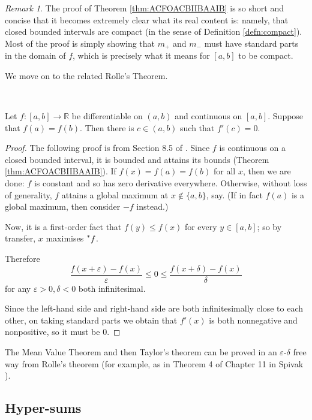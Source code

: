 \documentclass[11pt]{amsart}
\theoremstyle{remark}
\newtheorem*{remark}{Remark}
\newcommand{\hyp}[1][\mathbb{R}]{\prescript{*}{}{#1}}
\begin{document}
\begin{remark}
The proof of Theorem \ref{thm:ACFOACBIIBAAIB} is so short and concise that it becomes extremely clear what its real content is: namely, that closed bounded intervals are compact (in the sense of Definition \ref{defn:compact}).
Most of the proof is simply showing that $m_+$ and $m_-$ must have standard parts in the domain of $f$, which is precisely what it means for $[a,b]$ to be compact.
\end{remark}

We move on to the related Rolle's Theorem.

\

\begin{thm} \label{thm:rolle} Let $f: [a,b] \to \mathbb{R}$ be differentiable on $(a,b)$ and continuous on $[a,b]$.
Suppose that $f(a) = f(b)$.
Then there is $c \in (a,b)$ such that $f'(c) = 0$. 
\end{thm}
\begin{proof}
The following proof is from Section 8.5 of \cite{goldblatt}.
Since $f$ is continuous on a closed bounded interval, it is bounded and attains its bounds (Theorem \ref{thm:ACFOACBIIBAAIB}).
If $f(x) = f(a) = f(b)$ for all $x$, then we are done: $f$ is constant and so has zero derivative everywhere.
Otherwise, without loss of generality, $f$ attains a global maximum at $x \not \in \{a, b\}$, say.
(If in fact $f(a)$ is a global maximum, then consider $-f$ instead.)

Now, it is a first-order fact that $f(y) \leq f(x)$ for every $y \in [a,b]$; so by transfer, $x$ maximises $\hyp[f]$.

Therefore $$\frac{f(x+\varepsilon) - f(x)}{\varepsilon} \leq 0 \leq \frac{f(x+\delta) - f(x)}{\delta}$$
for any $\varepsilon > 0, \delta < 0$ both infinitesimal.

Since the left-hand side and right-hand side are both infinitesimally close to each other, on taking standard parts we obtain that $f'(x)$ is both nonnegative and nonpositive, so it must be $0$.
\end{proof}

The Mean Value Theorem and then Taylor's theorem can be proved in an $\varepsilon$-$\delta$ free way from Rolle's theorem (for example, as in Theorem 4 of Chapter 11 in Spivak \cite{spivak}).

\subsection{Hyper-sums} \label{sec:hypersums}
\end{document}
